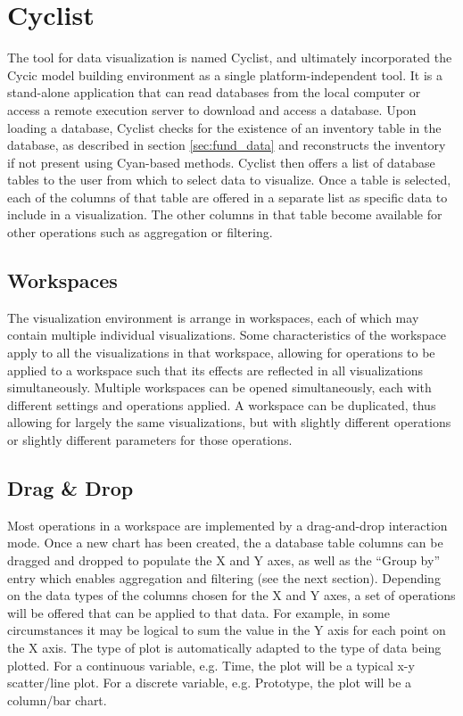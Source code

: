 \section{Cyclist}

The tool for data visualization is named Cyclist, and ultimately incorporated
the Cycic model building environment as a single platform-independent tool.
It is a stand-alone application that can read \Cyclus databases from the local
computer or access a remote execution server to download and access a
database.  Upon loading a database, Cyclist checks for the existence of an
inventory table in the database, as described in section \ref{sec:fund_data}
and reconstructs the inventory if not present using Cyan-based methods.
Cyclist then offers a list of database tables to the user from which to select
data to visualize.  Once a table is selected, each of the columns of that
table are offered in a separate list as specific data to include in a
visualization.  The other columns in that table become available for other
operations such as aggregation or filtering.

\subsection{Workspaces}

The visualization environment is arrange in workspaces, each of which may
contain multiple individual visualizations.  Some characteristics of the
workspace apply to all the visualizations in that workspace, allowing for
operations to be applied to a workspace such that its effects are reflected in
all visualizations simultaneously.  Multiple workspaces can be opened
simultaneously, each with different settings and operations applied.  A
workspace can be duplicated, thus allowing for largely the same
visualizations, but with slightly different operations or slightly different
parameters for those operations.

\subsection{Drag \& Drop}

Most operations in a workspace are implemented by a drag-and-drop interaction
mode.  Once a new chart has been created, the a database table columns can be
dragged and dropped to populate the X and Y axes, as well as the ``Group by''
entry which enables aggregation and filtering (see the next section).
Depending on the data types of the columns chosen for the X and Y axes, a set
of operations will be offered that can be applied to that data.  For example,
in some circumstances it may be logical to sum the value in the Y axis for
each point on the X axis. The type of plot is automatically adapted to the
type of data being plotted.  For a continuous variable, e.g. Time, the plot
will be a typical x-y scatter/line plot.  For a discrete variable,
e.g. Prototype, the plot will be a column/bar chart.

